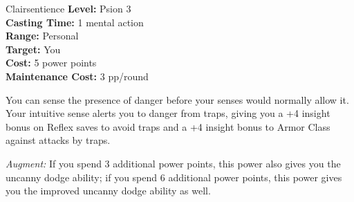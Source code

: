 {Clairsentience}
{
	\textbf{Level:}
	Psion 3\\
	\textbf{Casting Time:}
	1 mental action\\
	\textbf{Range:}
	Personal\\
	\textbf{Target:}
	You\\
	\textbf{Cost:}
	5 power points\\
	\textbf{Maintenance Cost:}
	3 pp/round\\
}
{
	You can sense the presence of danger before your senses would normally allow it. Your intuitive sense alerts you to danger from traps, giving you a +4 insight bonus on Reflex saves to avoid traps and a +4 insight bonus to Armor Class against attacks by traps.

	\textit{Augment:} If you spend 3 additional power points, this power also gives you the uncanny dodge ability; if you spend 6 additional power points, this power gives you the improved uncanny dodge ability as well.
}